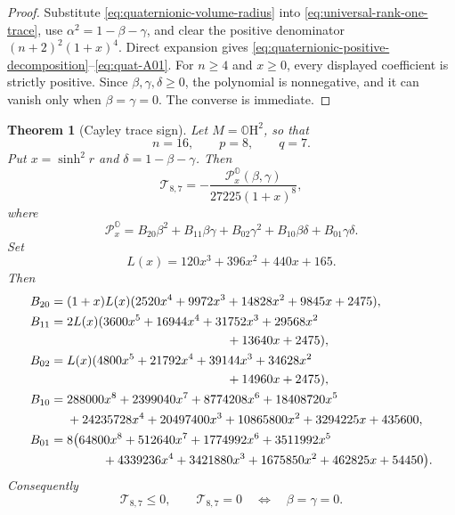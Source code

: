 \documentclass[11pt,reqno]{amsart}
\numberwithin{equation}{section}
\newtheorem{theorem}{Theorem}[section]
\theoremstyle{definition}
\theoremstyle{remark}
\newcommand{\OH}{\mathbb{O}\mathrm{H}}
\begin{document}
\begin{proof}
Substitute \eqref{eq:quaternionic-volume-radius} into
\eqref{eq:universal-rank-one-trace}, use
$\alpha^2=1-\beta-\gamma$, and clear the positive denominator
$(n+2)^2(1+x)^4$.  Direct expansion gives
\eqref{eq:quaternionic-positive-decomposition}--\eqref{eq:quat-A01}.
For $n\ge4$ and $x\ge0$, every displayed coefficient is strictly positive.
Since $\beta,\gamma,\delta\ge0$, the polynomial is nonnegative, and it can
vanish only when $\beta=\gamma=0$.  The converse is immediate.
\end{proof}

\begin{theorem}[Cayley trace sign]
\label{thm:Cayley-trace-sign}
Let $M=\OH^2$, so that
\[
n=16,
\qquad
p=8,
\qquad
q=7.
\]
Put $x=\sinh^2r$ and $\delta=1-\beta-\gamma$.  Then
\[
\mathscr T_{8,7}
=
-\frac{\mathcal P^{\mathbb O}_{x}(\beta,\gamma)}{27225(1+x)^8},
\]
where
\begin{equation}
\mathcal P^{\mathbb O}_{x}
=
B_{20}\beta^2
+B_{11}\beta\gamma
+B_{02}\gamma^2
+B_{10}\beta\delta
+B_{01}\gamma\delta.
\label{eq:Cayley-positive-decomposition}
\end{equation}
Set
\[
L(x)=120x^3+396x^2+440x+165.
\]
Then
\begin{align}
B_{20}
={}&
(1+x)L(x)
(2520x^4+9972x^3+14828x^2+9845x+2475),
\label{eq:Cayley-B20}
\\
B_{11}
={}&
2L(x)
(3600x^5+16944x^4+31752x^3+29568x^2
\nonumber\\
&\hspace{4.5cm}+13640x+2475),
\label{eq:Cayley-B11}
\\
B_{02}
={}&
L(x)
(4800x^5+21792x^4+39144x^3+34628x^2
\nonumber\\
&\hspace{4.5cm}+14960x+2475),
\label{eq:Cayley-B02}
\\
B_{10}
={}&
288000x^8
+2399040x^7
+8774208x^6
+18408720x^5
\nonumber\\
&+24235728x^4
+20497400x^3
+10865800x^2
+3294225x
+435600,
\label{eq:Cayley-B10}
\\
B_{01}
={}&
8\bigl(
64800x^8
+512640x^7
+1774992x^6
+3511992x^5
\nonumber\\
&\hspace{1.0cm}
+4339236x^4
+3421880x^3
+1675850x^2
+462825x
+54450
\bigr).
\label{eq:Cayley-B01}
\end{align}
Consequently
\[
\mathscr T_{8,7}\le0,
\qquad
\mathscr T_{8,7}=0
\quad\Longleftrightarrow\quad
\beta=\gamma=0.
\]
\end{theorem}
\end{document}
